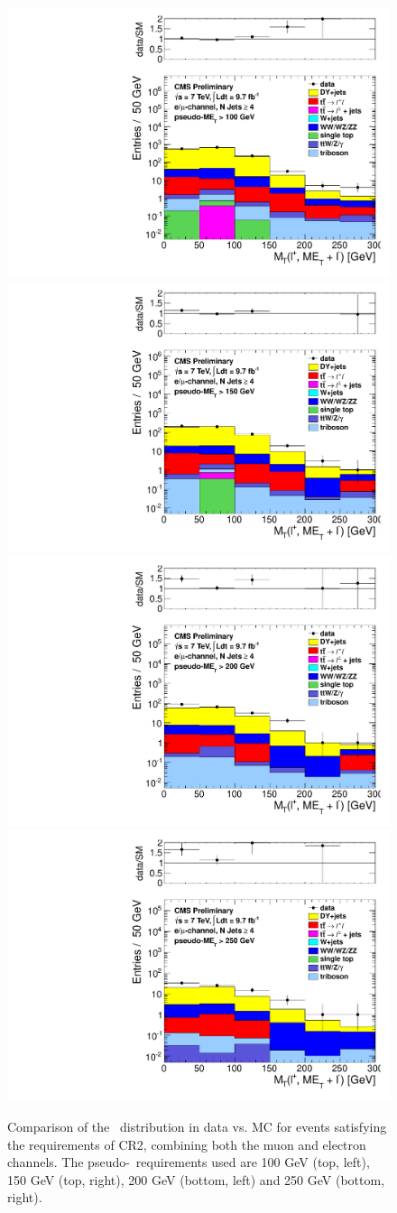 \begin{figure}[hbt]
  \begin{center}
	\includegraphics[width=0.5\linewidth]{plots/CR2plots/mt_lepcor_scaled_met100_nj4_emucomb.pdf}%
	\includegraphics[width=0.5\linewidth]{plots/CR2plots/mt_lepcor_scaled_met150_nj4_emucomb.pdf}
	\includegraphics[width=0.5\linewidth]{plots/CR2plots/mt_lepcor_scaled_met200_nj4_emucomb.pdf}%
	\includegraphics[width=0.5\linewidth]{plots/CR2plots/mt_lepcor_scaled_met250_nj4_emucomb.pdf}
    \caption{
      Comparison of the \mt\ distribution in data vs. MC for events
      satisfying the requirements of CR2, combining both the muon and
      electron channels. The pseudo-\met\ requirements used are
      100 GeV (top, left), 150 GeV (top, right), 200 GeV (bottom,
      left) and 250 GeV (bottom, right).
\label{fig:cr2mtrest} 
}  
      \end{center}
\end{figure}
\clearpage